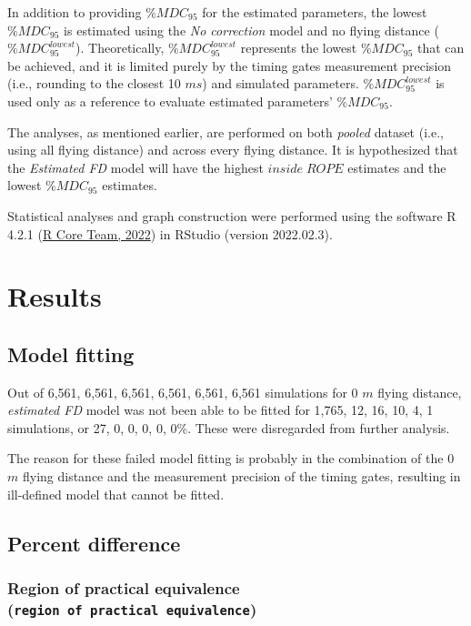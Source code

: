 \documentclass[fleqn,10pt]{wlpeerj} %
\begin{document}
In addition to providing \(\%MDC_{95}\) for the estimated parameters, the lowest \(\%MDC_{95}\) is estimated using the \emph{No correction} model and no flying distance (\(\%MDC_{95}^{lowest}\)). Theoretically, \(\%MDC_{95}^{lowest}\) represents the lowest \(\%MDC_{95}\) that can be achieved, and it is limited purely by the timing gates measurement precision (i.e., rounding to the closest 10 \(ms\)) and simulated parameters. \(\%MDC_{95}^{lowest}\) is used only as a reference to evaluate estimated parameters' \(\%MDC_{95}\).

The analyses, as mentioned earlier, are performed on both \emph{pooled} dataset (i.e., using all flying distance) and across every flying distance. It is hypothesized that the \emph{Estimated FD} model will have the highest \(inside \; ROPE\) estimates and the lowest \(\%MDC_{95}\) estimates.

Statistical analyses and graph construction were performed using the software R 4.2.1 (\protect\hyperlink{ref-R-base}{R Core Team, 2022}) in RStudio (version 2022.02.3).

\hypertarget{results}{%
\section{Results}\label{results}}

\hypertarget{model-fitting}{%
\subsection{Model fitting}\label{model-fitting}}

Out of 6,561, 6,561, 6,561, 6,561, 6,561, 6,561 simulations for 0 \(m\) flying distance, \emph{estimated FD} model was not been able to be fitted for 1,765, 12, 16, 10, 4, 1 simulations, or 27, 0, 0, 0, 0, 0\%. These were disregarded from further analysis.

The reason for these failed model fitting is probably in the combination of the 0 \(m\) flying distance and the measurement precision of the timing gates, resulting in ill-defined model that cannot be fitted.

\hypertarget{percent-difference}{%
\subsection{Percent difference}\label{percent-difference}}

\hypertarget{region-of-practical-equivalence-region-of-practical-equivalence}{%
\subsubsection{\texorpdfstring{Region of practical equivalence (\texttt{region\ of\ practical\ equivalence})}{Region of practical equivalence (region of practical equivalence)}}\label{region-of-practical-equivalence-region-of-practical-equivalence}}
\end{document}
